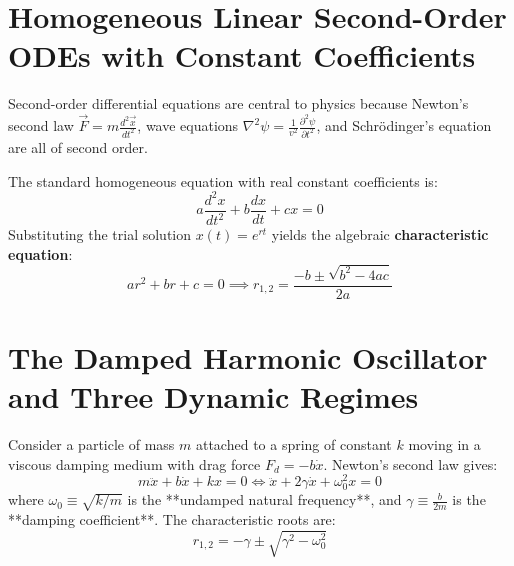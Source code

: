 \section{Homogeneous Linear Second-Order ODEs with Constant Coefficients}
Second-order differential equations are central to physics because Newton's second law $\vec{F} = m\frac{d^2\vec{x}}{dt^2}$, wave equations $\nabla^2 \psi = \frac{1}{v^2}\frac{\partial^2 \psi}{\partial t^2}$, and Schrödinger's equation are all of second order.

The standard homogeneous equation with real constant coefficients is:
\begin{equation}
a\frac{d^2 x}{dt^2} + b\frac{dx}{dt} + c x = 0
\end{equation}
Substituting the trial solution $x(t) = e^{rt}$ yields the algebraic \textbf{characteristic equation}:
\begin{equation}
a r^2 + b r + c = 0 \implies r_{1,2} = \frac{-b \pm \sqrt{b^2 - 4ac}}{2a}
\end{equation}

\section{The Damped Harmonic Oscillator and Three Dynamic Regimes}
Consider a particle of mass $m$ attached to a spring of constant $k$ moving in a viscous damping medium with drag force $F_d = -b\dot{x}$. Newton's second law gives:
\begin{equation}
m\ddot{x} + b\dot{x} + kx = 0 \iff \ddot{x} + 2\gamma\dot{x} + \omega_0^2 x = 0
\end{equation}
where $\omega_0 \equiv \sqrt{k/m}$ is the **undamped natural frequency**, and $\gamma \equiv \frac{b}{2m}$ is the **damping coefficient**. The characteristic roots are:
\begin{equation}
r_{1,2} = -\gamma \pm \sqrt{\gamma^2 - \omega_0^2}
\end{equation}

